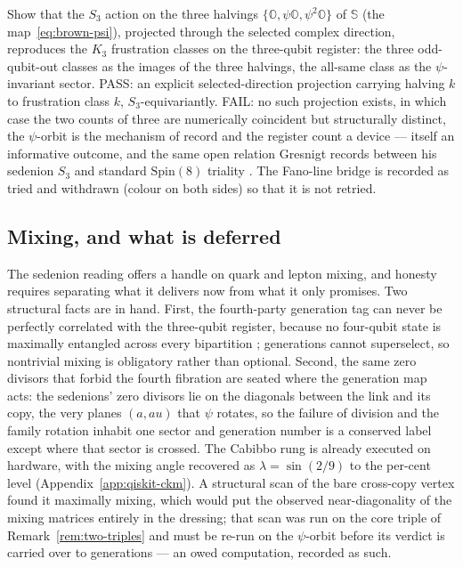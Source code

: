 \begin{openproblem}
\label{op:generation-mechanism}
Show that the $S_3$ action on the three halvings
$\{\mathbb{O}, \psi\mathbb{O}, \psi^{2}\mathbb{O}\}$ of $\mathbb{S}$ (the map~\eqref{eq:brown-psi}),
projected through the selected complex direction, reproduces the $K_3$ frustration classes on the
three-qubit register: the three odd-qubit-out classes as the images of the three halvings, the
all-same class as the $\psi$-invariant sector. \textup{PASS}: an explicit selected-direction
projection carrying halving $k$ to frustration class $k$, $S_3$-equivariantly. \textup{FAIL}: no
such projection exists, in which case the two counts of three are numerically coincident but
structurally distinct, the $\psi$-orbit is the mechanism of record and the register count a device
--- itself an informative outcome, and the same open relation Gresnigt records between his sedenion
$S_3$ and standard $\mathrm{Spin}(8)$ triality \autocite{gresnigt2026three}. The Fano-line bridge is
recorded as tried and withdrawn (colour on both sides) so that it is not retried.
\end{openproblem}

\subsection{Mixing, and what is deferred}
\label{sec:sedenions-mixing}

The sedenion reading offers a handle on quark and lepton mixing, and honesty requires separating what
it delivers now from what it only promises. Two structural facts are in hand. First, the fourth-party
generation tag can never be perfectly correlated with the three-qubit register, because no four-qubit
state is maximally entangled across every bipartition \autocite{higuchisudbery2000,hubersiewert2026};
generations cannot superselect, so nontrivial mixing is obligatory rather than optional. Second, the
same zero divisors that forbid the fourth fibration are seated where the generation map acts: the
sedenions' zero divisors lie on the diagonals between the link and its copy, the very planes
$(a, au)$ that $\psi$ rotates, so the failure of division and the family rotation inhabit one sector
and generation number is a conserved label except where that sector is crossed. The Cabibbo rung is
already executed on hardware, with the mixing angle recovered as $\lambda = \sin(2/9)$ to the
per-cent level (Appendix~\ref{app:qiskit-ckm}). A structural scan of the bare cross-copy vertex
found it maximally mixing, which would put the observed near-diagonality of the mixing matrices
entirely in the dressing; that scan was run on the core triple of Remark~\ref{rem:two-triples} and
must be re-run on the $\psi$-orbit before its verdict is carried over to generations --- an owed
computation, recorded as such.

